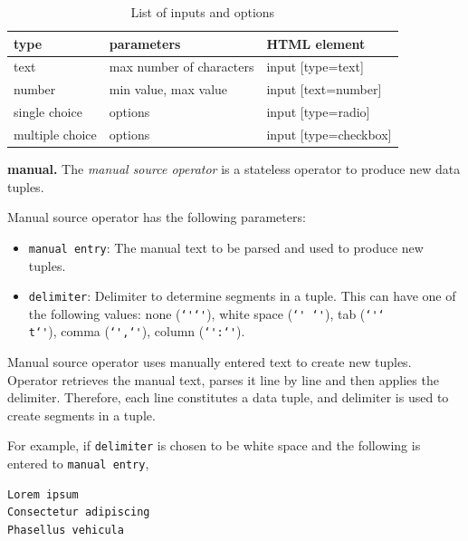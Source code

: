\begin{table}[ht]
	\centering
	\caption{List of inputs and options}
	\label{tab:input list}
	\begin{tabular}{| l | l | l |}
		\hline
		type & parameters & HTML element \\ \hline
		text & max number of characters & input [type=text] \\ \hline
		number & min value, max value & input [text=number] \\ \hline
		single choice & options & input [type=radio] \\ \hline
		multiple choice & options & input [type=checkbox] \\ \hline
	\end{tabular}
\end{table} 



\textbf{manual.}
The \textit{manual source operator} is a stateless operator to produce new data 
tuples.

\newcommand{\ditto}{\texttt{\char`\'}}

Manual source operator has the following parameters:
\begin{itemize}
	\item \texttt{manual entry}: The manual text to be parsed and used to produce 
	new tuples.
	\item \texttt{delimiter}: Delimiter to determine segments in a tuple. This can have one 
	of the following values: none (\ditto\ditto), white space (\ditto\texttt{ }\ditto), 
	tab (\ditto\texttt{\char`\\t}\ditto), comma (\ditto\texttt{,}\ditto), 
	column (\ditto\texttt{:}\ditto).
\end{itemize}

Manual source operator uses manually entered text to create new tuples. Operator 
retrieves the manual text, parses it line by line and then applies the delimiter. 
Therefore, each line constitutes a data tuple, and delimiter is used to create segments 
in a tuple.

For example, if \texttt{delimiter} is chosen to be white space and the following is 
entered to \texttt{manual entry},

\begin{lstlisting}
Lorem ipsum
Consectetur adipiscing
Phasellus vehicula
\end{lstlisting}


